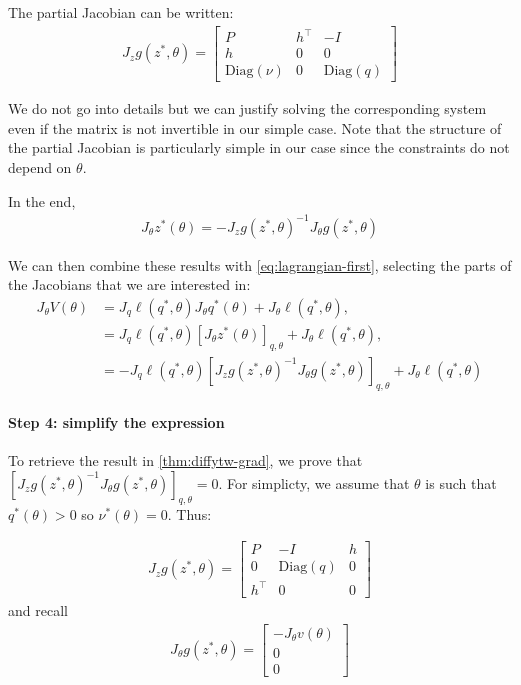 The partial Jacobian can be written:
\begin{align}
    J_z g(z^*, \theta) = \begin{bmatrix}
    P & h^\top  & - I\\
    h & 0 & 0\\
    \mathrm{Diag}(\nu)& 0 & \mathrm{Diag}(q)
    \end{bmatrix}
\end{align}

We do not go into details but we can justify solving the corresponding system even if the matrix is not invertible in our simple case. Note that the structure of the partial Jacobian is particularly simple in our case since the constraints do not depend on $\theta$.


In the end,
\begin{align}
    J_\theta z^*(\theta) = - J_zg(z^*, \theta)^{-1}J_\theta g(z^*, \theta)
\end{align}


We can then combine these results with \cref{eq:lagrangian-first}, selecting the parts of the Jacobians that we are interested in:
\begin{align}
J_\theta V(\theta) &=  J_q \ell(q^*, \theta)J_\theta q^*(\theta) + J_\theta \ell(q^*, \theta),\\
&= J_q \ell(q^*, \theta)  \left[J_\theta z^*(\theta)\right]_{q, \theta} + J_\theta \ell(q^*, \theta),\\
&= - J_q\ell(q^*, \theta) \left[J_z g(z^*, \theta)^{-1} J_\theta g(z^*, \theta)\right]_{q,\theta}+ J_\theta \ell(q^*, \theta)
\end{align}

\paragraph{Step 4: simplify the expression} To retrieve the result in \cref{thm:diffytw-grad}, we prove that $\left[J_z g(z^*, \theta)^{-1} J_\theta g(z^*, \theta)\right]_{q,\theta}=0$. For simplicty, we assume that $\theta$ is such that $q^*(\theta) > 0 $ so $\nu^*(\theta)=0$. Thus:

\begin{align}
    J_z g(z^*, \theta) = \begin{bmatrix}
    P & - I & h\\
    0 & \mathrm{Diag}(q)& 0\\
    h^\top  & 0 & 0
    \end{bmatrix}
\end{align}
 and recall
\begin{align}
    J_\theta g(z^*, \theta) = \begin{bmatrix}
    -J_\theta v(\theta)\\
    0 \\
    0
    \end{bmatrix}
\end{align}


